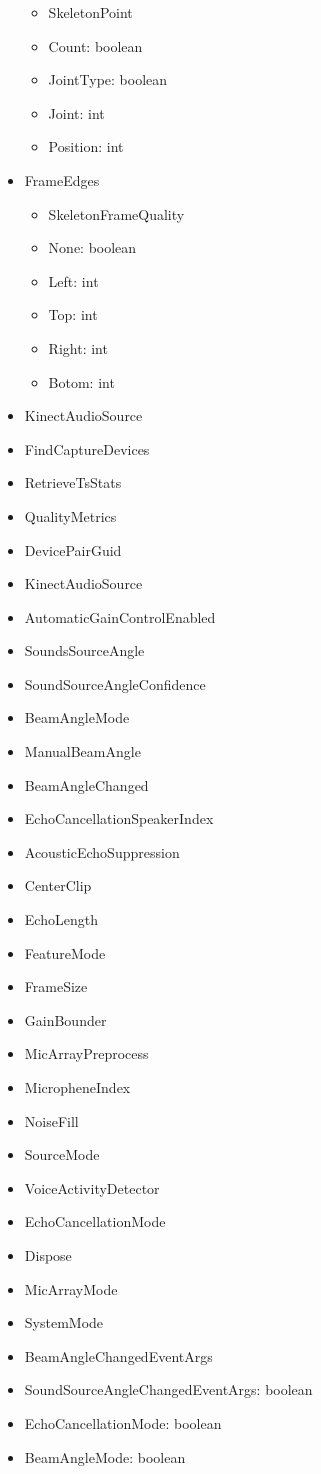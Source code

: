 \documentclass[11pt,a4paper]{article}
\begin{document}
\begin{itemize}
\begin{itemize}
	\item SkeletonPoint
	\item Count: boolean
	\item JointType: boolean
	\item Joint: int
	\item Position: int
	\end{itemize}	
\item FrameEdges
	\begin{itemize}
	 \item SkeletonFrameQuality
	\item None: boolean
	\item Left: int
	\item Top: int
	\item Right: int
	\item Botom: int
	\end{itemize}
\item KinectAudioSource
	\item FindCaptureDevices
	\item RetrieveTsStats
	\item QualityMetrics
	\item DevicePairGuid
	\item KinectAudioSource
	\item AutomaticGainControlEnabled
	\item SoundsSourceAngle
	\item SoundSourceAngleConfidence
	\item BeamAngleMode
	\item ManualBeamAngle
	\item BeamAngleChanged
	\item EchoCancellationSpeakerIndex
	\item AcousticEchoSuppression
	\item CenterClip
	\item EchoLength
	\item FeatureMode
	\item FrameSize
	\item GainBounder
	\item MicArrayPreprocess
	\item MicropheneIndex
	\item NoiseFill
	\item SourceMode
	\item VoiceActivityDetector
	\item EchoCancellationMode
	\item Dispose
	\item MicArrayMode
	\item SystemMode
	\item BeamAngleChangedEventArgs
	\item SoundSourceAngleChangedEventArgs: boolean
	\item EchoCancellationMode: boolean
	\item BeamAngleMode: boolean
\end{itemize}
\end{document}
